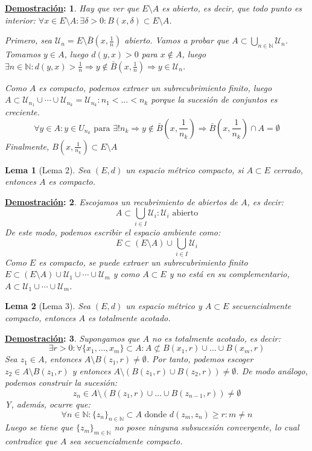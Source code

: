 \documentclass[10pt,a4paper,openright]{book}
\theoremstyle{break}
\newtheorem*{lema}{Lema}
\newtheorem*{demo}{\underline{Demostración}:}
\begin{document}
\begin{demo}
Hay que ver que $E \setminus A$ es abierto, es decir, que todo punto es interior: $\forall x \in E \setminus A: \exists \delta > 0 : B(x, \delta) \subset E \setminus A$.

Primero, sea $\mathcal{U}_n = E \setminus \bar{B}\left(x, \frac{1}{n}\right)$ abierto. Vamos a probar que $A \subset \bigcup_{n \in \mathbb{N}} \mathcal{U}_n$. Tomamos $y \in A$, luego $d(y,x) > 0$ para $x\notin A$, luego $\exists n \in \mathbb{N} : d(y,x) > \frac{1}{n} \Rightarrow y \notin \bar{B}(x, \frac{1}{n})\Rightarrow y \in \mathcal{U}_n$.

Como $A$ es compacto, podemos extraer un subrecubrimiento finito, luego $A \subset \mathcal{U}_{n_1} \cup \cdots \cup \mathcal{U}_{n_k} = \mathcal{U}_{n_k} : n_1 < \ldots < n_k$ porque la sucesión de conjuntos es creciente.
$$\forall y \in A : y \in U_{n_k} \mbox{ para } \exists! n_k \Rightarrow y \notin \bar{B}\left(x, \frac{1}{n_k}\right) \Rightarrow \bar{B}\left(x, \frac{1}{n_k}\right) \cap A = \emptyset$$
Finalmente, $B\left(x, \frac{1}{n_k}\right) \subset E \setminus A$
\end{demo}

\begin{lema}[Lema 2]
Sea $(E,d)$ un espacio métrico compacto, si $A \subset E$ cerrado, entonces $A$ es compacto.
\end{lema}

\begin{demo}
Escojamos un recubrimiento de abiertos de $A$, es decir:
$$A \subset \bigcup_{i \in I} \mathcal{U}_i : \mathcal{U}_i \mbox{ abierto}$$
De este modo, podemos escribir el espacio ambiente como:
$$E \subset (E \setminus A) \cup  \bigcup_{i \in I} \mathcal{U}_i$$
Como $E$ es compacto, se puede extraer un subrecubrimiento finito $E \subset (E \setminus A) \cup \mathcal{U}_1 \cup \cdots \cup \mathcal{U}_m$ y como $A\subset E$ y no está en su complementario, $A \subset \mathcal{U}_1 \cup \cdots \cup \mathcal{U}_m$.
\end{demo}


\begin{lema}[Lema 3]
Sea $(E,d)$ un espacio métrico y $A \subset E$ secuencialmente compacto, entonces $A$ es totalmente acotado.
\end{lema}

\begin{demo}
Supongamos que $A$ no es totalmente acotado, es decir:
$$\exists r > 0 : \forall \{x_1, \ldots, x_m\} \subset A : A \not\subset B(x_1, r) \cup \ldots \cup B(x_m,r)$$
Sea $z_1 \in A$, entonces $A \setminus B(z_1,r) \neq \emptyset$. Por tanto, podemos escoger $z_2 \in A\setminus{B(z_1, r)}$ y entonces $A \setminus \left( B(z_1,r) \cup B(z_2,r) \right) \neq \emptyset$. De modo análogo, podemos construir la sucesión:
$$z_n \in A \setminus \left( B(z_1,r) \cup \ldots \cup B(z_{n-1},r) \right) \neq \emptyset$$
Y, además, ocurre que:
$$\forall n \in \mathbb{N} : \{z_n\}_{n \in \mathbb{N}} \subset A \mbox{ donde }d(z_m, z_n) \geq r : m \neq n$$
Luego se tiene que $\{z_m\}_{m \in \mathbb{N}}$ no posee ninguna subsucesión convergente, lo cual contradice que $A$ sea secuencialmente compacto.
\end{demo}
\end{document}
